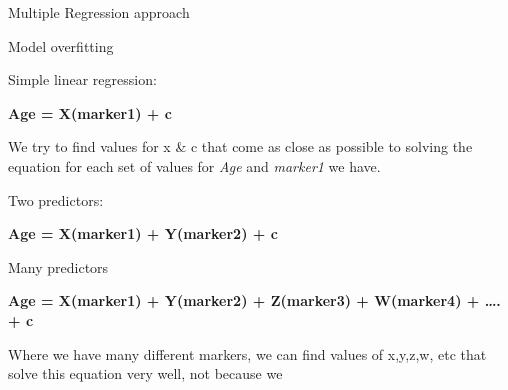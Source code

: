 \documentclass[ignorenonframetext,]{beamer}
\begin{document}
\begin{frame}{Multiple Regression approach}

\begin{block}{Model overfitting}

\begin{block}{Simple linear regression:}

\textbf{Age = X(marker1) + c}

We try to find values for x \& c that come as close as possible to
solving the equation for each set of values for \emph{Age} and
\emph{marker1} we have.

\end{block}

\begin{block}{Two predictors:}

\textbf{Age = X(marker1) + Y(marker2) + c}

\end{block}

\begin{block}{Many predictors}

\textbf{Age = X(marker1) + Y(marker2) + Z(marker3) + W(marker4) +
\ldots{}. + c}

Where we have many different markers, we can find values of x,y,z,w, etc
that solve this equation very well, not because we

\end{block}

\end{block}

\end{frame}

\begin{frame}{}

\end{frame}
\end{document}
